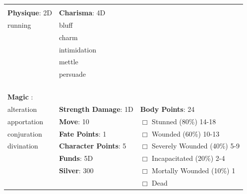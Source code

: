 \documentclass[10pt]{article}
\begin{document}
\begin{table}
\begin{tabular}{m{156pt} m{156pt} m{156pt}}
 \hrulefill &  \hrulefill &  \hrulefill \\


\textbf{Physique}: 2D \hrulefill & \textbf{Charisma}: 4D \hrulefill     &  \hrulefill \\

running              \hrulefill & bluff                \hrulefill &  \hrulefill \\

 \hrulefill & charm                \hrulefill &  \hrulefill \\

 \hrulefill & intimidation         \hrulefill &  \hrulefill \\

 \hrulefill & mettle               \hrulefill &  \hrulefill \\

 \hrulefill & persuade             \hrulefill &  \hrulefill \\

 \hrulefill &  \hrulefill &  \hrulefill \\

 \hrulefill &  \hrulefill &  \hrulefill \\

 \hrulefill &  \hrulefill &  \hrulefill \\

                                  &                                 &                             \\
\textbf{Magic }:  \hrulefill  &                                 &                             \\
alteration           \hrulefill & \textbf{Strength Damage}: 1D \hrulefill                             & \textbf{Body Points}: 24 \hrulefill \\
apportation          \hrulefill                        & \textbf{Move}:             10             \hrulefill    & $\Box$ Stunned \footnotesize{(80\%)} \hfill 14-18 \\
conjuration          \hrulefill                        & \textbf{Fate Points}:      1      \hrulefill    & $\Box$ Wounded \footnotesize{(60\%)} \hfill 10-13 \\
divination           \hrulefill                        & \textbf{Character Points}: 5 \hrulefill    & $\Box$ Severely Wounded \footnotesize{(40\%)} \hfill 5-9 \\
 \hrulefill                        & \textbf{Funds}:            5D            \hrulefill    & $\Box$ Incapacitated \footnotesize{(20\%)} \hfill 2-4 \\
 \hrulefill                        & \textbf{Silver}:           300           \hrulefill    & $\Box$ Mortally Wounded \footnotesize{(10\%)} \hfill 1 \\
 \hrulefill                        &  \hrulefill                                                       & $\Box$ Dead   \\
\end{tabular}
\end{table}
\end{document}
